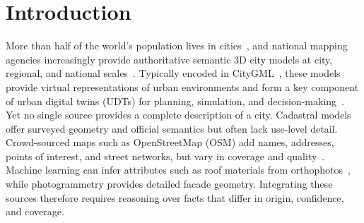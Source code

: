 \documentclass[sigconf,authordraft]{acmart}
\begin{document}

\maketitle

\section{Introduction}\label{sec:introduction}

More than half of the world's population lives in cities~\cite{un_urban_2018}, and national mapping agencies increasingly provide authoritative semantic 3D city models at city, regional, and national scales~\cite{nyc_3dbuildingmodel_2016,plateau_3dcitymodel_2021,adv_buildings_2025}. Typically encoded in CityGML~\cite{groeger_citygml2_2012, kolbe_citygml3_2021}, these models provide virtual representations of urban environments and form a key component of urban digital twins (UDTs) for planning, simulation, and decision-making~\cite{ketzler_udtreview_2020, lei_udt_survey_2023}. Yet no single source provides a complete description of a city. Cadastral models offer surveyed geometry and official semantics but often lack use-level detail. Crowd-sourced maps such as OpenStreetMap (OSM) add names, addresses, points of interest, and street networks, but vary in coverage and quality~\cite{biljecki_qualitycrowsourced_2023}. Machine learning can infer attributes such as roof materials from orthophotos~\cite{lukas_roofmaterials, kanna2026semantic}, while photogrammetry provides detailed facade geometry. Integrating these sources therefore requires reasoning over facts that differ in origin, confidence, and coverage.
\end{document}

